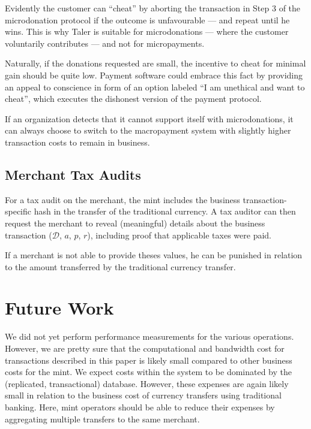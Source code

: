 \documentclass{llncs}
\begin{document}
Evidently the customer can ``cheat'' by aborting the transaction in
Step 3 of the microdonation protocol if the outcome is unfavourable ---
and repeat until he wins.  This is why Taler is suitable for
microdonations --- where the customer voluntarily contributes ---
and not for micropayments.

Naturally, if the donations requested are small, the incentive to
cheat for minimal gain should be quite low.  Payment software could
embrace this fact by providing an appeal to conscience in form of an
option labeled ``I am unethical and want to cheat'', which executes
the dishonest version of the payment protocol.

If an organization detects that it cannot support itself with
microdonations, it can always choose to switch to the macropayment
system with slightly higher transaction costs to remain in business.

\subsection{Merchant Tax Audits}

For a tax audit on the merchant, the mint includes the business
transaction-specific hash in the transfer of the traditional
currency.  A tax auditor can then request the merchant to reveal
(meaningful) details about the business transaction ($\mathcal{D}$,
$a$, $p$, $r$), including proof that applicable taxes were paid.

If a merchant is not able to provide theses values, he can be punished
in relation to the amount transferred by the traditional currency
transfer.


\section{Future Work}


We did not yet perform performance measurements for the various
operations.  However, we are pretty sure that the computational and
bandwidth cost for transactions described in this paper is likely
small compared to other business costs for the mint.  We expect costs
within the system to be dominated by the (replicated, transactional)
database.  However, these expenses are again likely small in relation
to the business cost of currency transfers using traditional banking.
Here, mint operators should be able to reduce their expenses by
aggregating multiple transfers to the same merchant.
\end{document}
